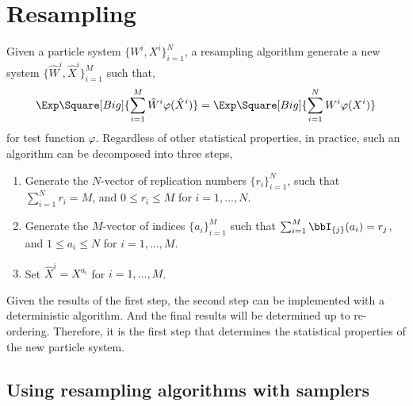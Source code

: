 \chapter{Resampling}
\label{chap:Resampling}

Given a particle system $\{W^i,X^i\}_{i=1}^N$, a resampling algorithm
generate a new system $\{\hat{W}^i, \hat{X}^i\}_{i=1}^M$ such that,
\begin{equation*}
  \Exp\Square[Big]{\sum_{i=1}^M{\hat{W}^i\varphi(\hat{X}^i)}} = 
  \Exp\Square[Big]{\sum_{i=1}^N{W^i\varphi(X^i)}}
\end{equation*}
for test function $\varphi$. Regardless of other statistical properties, in
practice, such an algorithm can be decomposed into three steps,
\begin{enumerate}
  \item Generate the $N$-vector of replication numbers $\{r_i\}_{i=1}^N$, such
    that $\sum_{i=1}^N r_i = M$, and $0 \le r_i \le M$ for $i=1,\dots,N$.
  \item Generate the $M$-vector of indices $\{a_i\}_{i=1}^M$ such that
    $\sum_{i=1}^M \bbI_{\{j\}}(a_i) = r_j$, and $1 \le a_i \le N$ for $i =
    1,\dots,M$.
  \item Set $\hat{X}^i = X^{a_i}$ for $i = 1,\dots,M$.
\end{enumerate}
Given the results of the first step, the second step can be implemented with a
deterministic algorithm. And the final results will be determined up to
re-ordering. Therefore, it is the first step that determines the statistical
properties of the new particle system.

\section{Using resampling algorithms with samplers}
\label{sec:Using resampling algorithms with samplers}

